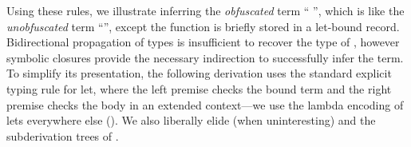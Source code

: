 Using these rules, we illustrate inferring the \emph{obfuscated} term
                      ``{
                              {}}'',
which is like the \emph{unobfuscated} term ``{\ltiappParens{\ltiufun{\ltivar{}}{\ltiF{}}}{\ltiE{}}}'',
except the function is briefly stored in a let-bound record.
Bidirectional propagation of types is insufficient to recover the type of {\ltivar{}},
however symbolic closures provide the necessary indirection to successfully infer the term.
To simplify its presentation, the following derivation uses the standard explicit typing rule for let,
where the left premise checks the bound term and the right premise checks the body in an extended context---we use 
the lambda encoding of lets everywhere else ().
We also liberally elide \ltiEnv{} (when uninteresting)
and the subderivation trees of \ltiSimpAppInfClosure.

